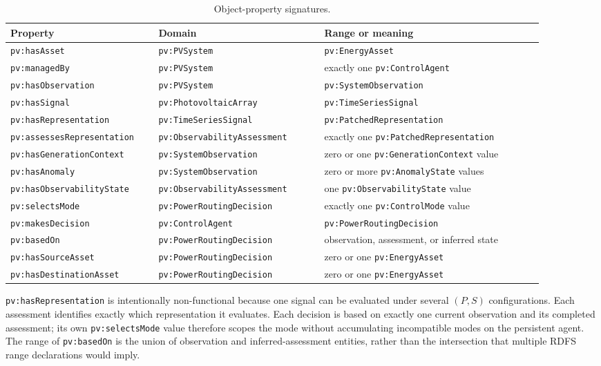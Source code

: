 \documentclass[
	letterpaper,
	10pt,
	unnumberedsections,
	twoside,
]{LTJournalArticle}
\newcommand{\pv}[1]{\texttt{pv:#1}}
\begin{document}
\begin{table}[H]
\centering
\caption{Object-property signatures.}
\label{tab:objects}
\small
\begin{tabular}{@{}L{0.25\linewidth}L{0.29\linewidth}L{0.37\linewidth}@{}}
\toprule
\textbf{Property} & \textbf{Domain} & \textbf{Range or meaning} \\
\midrule
\pv{hasAsset} & \pv{PVSystem} & \pv{EnergyAsset} \\
\pv{managedBy} & \pv{PVSystem} & exactly one \pv{ControlAgent} \\
\pv{hasObservation} & \pv{PVSystem} & \pv{SystemObservation} \\
\pv{hasSignal} & \pv{PhotovoltaicArray} & \pv{TimeSeriesSignal} \\
\pv{hasRepresentation} & \pv{TimeSeriesSignal} & \pv{PatchedRepresentation} \\
\pv{assessesRepresentation} & \pv{ObservabilityAssessment} & exactly one \pv{PatchedRepresentation} \\
\pv{hasGenerationContext} & \pv{SystemObservation} & zero or one \pv{GenerationContext} value \\
\pv{hasAnomaly} & \pv{SystemObservation} & zero or more \pv{AnomalyState} values \\
\pv{hasObservabilityState} & \pv{ObservabilityAssessment} & one \pv{ObservabilityState} value \\
\pv{selectsMode} & \pv{PowerRoutingDecision} & exactly one \pv{ControlMode} value \\
\pv{makesDecision} & \pv{ControlAgent} & \pv{PowerRoutingDecision} \\
\pv{basedOn} & \pv{PowerRoutingDecision} & observation, assessment, or inferred state \\
\pv{hasSourceAsset} & \pv{PowerRoutingDecision} & zero or one \pv{EnergyAsset} \\
\pv{hasDestinationAsset} & \pv{PowerRoutingDecision} & zero or one \pv{EnergyAsset} \\
\bottomrule
\end{tabular}
\end{table}

\pv{hasRepresentation} is intentionally non-functional because one signal can be evaluated under several $(P,S)$ configurations. Each assessment identifies exactly which representation it evaluates. Each decision is based on exactly one current observation and its completed assessment; its own \pv{selectsMode} value therefore scopes the mode without accumulating incompatible modes on the persistent agent. The range of \pv{basedOn} is the union of observation and inferred-assessment entities, rather than the intersection that multiple RDFS range declarations would imply.
\end{document}
